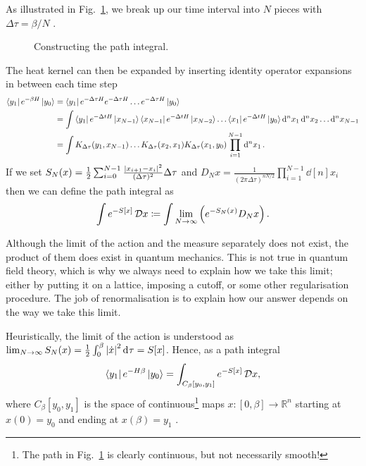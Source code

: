 As illustrated in Fig.~\ref{fig:l5f1}, we break up our time interval into $N$  pieces with $\Delta \tau = \beta / N$ .
\begin{figure}[tbhp]
  \centering
  \def\svgwidth{0.4\columnwidth}
  
  \caption{Constructing the path integral.}
  \label{fig:l5f1}
\end{figure} 
The heat kernel can then be expanded by inserting identity operator expansions in between each time step
\begin{align}
  \bra{y_1} e^{-\beta H} \ket{y_0} &= \bra{y_1} e^{- \Delta \tau H} e^{-\Delta \tau H} \dots e^{- \Delta \tau H} \ket{y_0} \\
  &= \int \bra{y_1} e^{-\Delta t H} \ket{x_{N-1}}
  \bra{x_{N-1}} e^{-\Delta t H} \ket{x_{N-2}} \dots
  \bra{x_1} e^{-\Delta t H} \ket{y_0} \dd[n]{x_1} \dd[n]{x_2} \dots \dd[n]{x_{N-1}} \\
  &= \int K_{\Delta \tau} (y_1, x_{N-1}) \dots K_{\Delta \tau} (x_2, x_1) K_{\Delta \tau} (x_1, y_0) \prod_{i = 1}^{N-1} \dd[n]{x_1}.
\end{align}
If we set $S_N (x) = \frac{1}{2} \sum_{i = 0}^{N-1} \frac{\abs{x_{i+1}-x_i}^2}{(\Delta \tau)^2} \Delta \tau$ and $D_N x = \frac{1}{(2 \pi \Delta \tau)^{n N / 2}} \prod_{i = 1}^{N-1} \dd[n]{x_i}$ then we can define the path integral as 
\begin{equation}
  \int e^{-S[x]} \mathop{\mathcal{D} x} \coloneqq \int \lim_{N \to \infty} \left( e^{-S_N(x)} D_N x \right) .
\end{equation}
\begin{leftbar}
  Although the limit of the action and the measure separately does not exist, the product of them does exist in quantum mechanics. This is not true in quantum field theory, which is why we always need to explain how we take this limit; either by putting it on a lattice, imposing a cutoff, or some other regularisation procedure. The job of renormalisation is to explain how our answer depends on the way we take this limit.
\end{leftbar}

Heuristically, the limit of the action is understood as $\lim_{N \to \infty}  S_N(x) = \frac{1}{2} \int_0^\beta \abs{\dot{x}}^2 \dd[]{\tau} = S[x]$. Hence, as a path integral 
\begin{equation}
  \bra{y_1} e^{- H \beta} \ket{y_0} = \int_{C_{\beta} [y_0, y_1]} e^{-S[x]} \mathop{\mathcal{D} x},
\end{equation}
where $C_{\beta} [y_0, y_1]$ is the space of continuous\footnote{The path in Fig.~\ref{fig:l5f1} is clearly continuous, but not necessarily smooth!} maps $x \colon [0, \beta] \to \mathbb{R}^n$  starting at $x(0) = y_0$  and ending at $x(\beta) = y_1$ .

